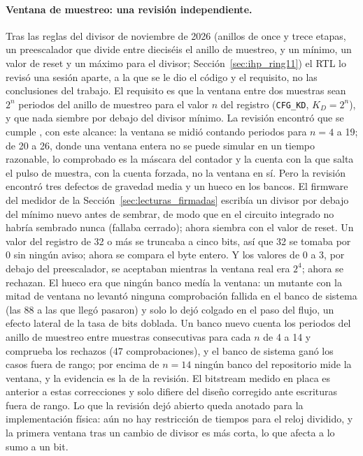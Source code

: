 \paragraph{Ventana de muestreo: una revisión independiente.} Tras las
reglas del divisor de noviembre de 2026 (anillos de once y trece etapas,
un preescalador que divide entre dieciséis el anillo de muestreo, y un
mínimo, un valor de reset y un máximo para el divisor;
Sección~\ref{sec:ihp_ring11}) el \ac{RTL} lo revisó una sesión aparte, a
la que se le dio el código y el requisito, no las conclusiones del
trabajo. El requisito es que la ventana entre dos muestras sean $2^{n}$
periodos del anillo de muestreo para el valor $n$ del registro
(\texttt{CFG\_KD}, $K_D = 2^{n}$), y que nada siembre por debajo del
divisor mínimo. La revisión encontró que se cumple \simu{}, con este
alcance: la ventana se midió contando periodos para $n = 4$ a 19; de 20
a 26, donde una ventana entera no se puede simular en un tiempo
razonable, lo comprobado es la máscara del contador y la cuenta con la
que salta el pulso de muestra, con la cuenta forzada, no la ventana en
sí. Pero la revisión encontró tres defectos de gravedad
media y un hueco en los bancos. El firmware del medidor de la
Sección~\ref{sec:lecturas_firmadas} escribía un divisor por debajo del
mínimo nuevo antes de sembrar, de modo que en el circuito integrado no
habría sembrado nunca (fallaba cerrado); ahora siembra con el valor de
reset. Un valor del registro de 32 o más se truncaba a cinco bits, así
que 32 se tomaba por 0 sin ningún aviso; ahora se compara el byte
entero. Y los valores de 0 a 3, por debajo del preescalador, se
aceptaban mientras la ventana real era $2^{4}$; ahora se rechazan. El
hueco era que ningún banco medía la ventana: un mutante con la mitad de
ventana no levantó ninguna comprobación fallida en el banco de sistema
(las 88 a las que llegó pasaron) y solo lo dejó colgado en el paso del
flujo, un efecto lateral de la tasa de bits doblada. Un banco nuevo
cuenta los periodos del anillo de muestreo entre muestras consecutivas
para cada $n$ de 4 a 14 y comprueba los rechazos (47 comprobaciones), y
el banco de sistema ganó los casos fuera de rango; por encima de
$n = 14$ ningún banco del repositorio mide la ventana, y la evidencia es
la de la revisión. El bitstream medido en placa es anterior
a estas correcciones y solo difiere del diseño corregido ante escrituras
fuera de rango. Lo que la revisión dejó abierto queda anotado para la
implementación física: aún no hay restricción de tiempos para el reloj
dividido, y la primera ventana tras un cambio de divisor es más corta,
lo que afecta a lo sumo a un bit.

